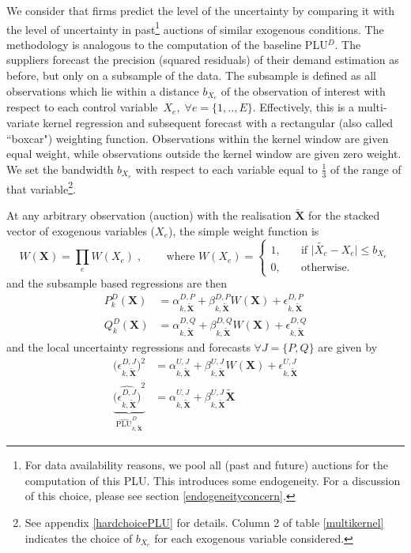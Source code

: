 We consider that firms predict the level of the uncertainty by comparing it with the level of uncertainty in past\footnote{For data availability reasons, we pool all (past and future) auctions for the computation of this PLU. This introduces some endogeneity. For a discussion of this choice, please see section \ref{endogeneityconcern}.} auctions of similar exogenous conditions. 
The methodology is analogous to the computation of the baseline PLU$^D$. The suppliers forecast the precision (squared residuals) of their demand estimation as before, but only on a subsample of the data. The subsample is defined as all observations which lie within a distance $b_{X_e}$ of the observation of interest with respect to each %
control variable~$X_e , \; \forall e=\{1,..,E\}$. Effectively, this is a multi-variate kernel regression and subsequent forecast with a rectangular (also called ``boxcar") weighting function. Observations within the kernel window are given equal weight, while observations outside the kernel window are given zero weight. We set the bandwidth $b_{X_e}$ with respect to each variable equal to $\frac{1}{3}$ of the range of that variable\footnote{See appendix \ref{hardchoicePLU} for details. Column 2 of table \ref{multikernel} indicates the choice of $b_{X_e}$ for each exogenous variable considered.}. 

At any arbitrary observation (auction) with the realisation $\boldsymbol{\tilde{X}}$ for the stacked vector of exogenous variables ($X_e$), the simple weight function is 
\begin{equation}
W(\boldsymbol{X}) =  \prod_{e} W(X_e) \; \text{,} \quad  \quad  \text{ where  } 
W(X_e) = \begin{cases} 1, \quad & \mbox{if } \vert \tilde{X_e} - X_e \vert \leq b_{X_e} 
\\ 
0, \quad & \mbox{otherwise. } \end{cases}
\end{equation}
and the subsample based regressions are then
\begin{align}
P^D_k(\boldsymbol{X}) &= \alpha^{D,P}_{k,\boldsymbol{\tilde{X}}} + \beta^{D,P}_{k,\boldsymbol{\tilde{X}}} W(\boldsymbol{X}) + \epsilon^{D,P}_{k,\boldsymbol{\tilde{X}}} \\
Q^D_k(\boldsymbol{X}) &= \alpha^{D,Q}_{k,\boldsymbol{\tilde{X}}} + \beta^{D,Q}_{k,\boldsymbol{\tilde{X}}} W(\boldsymbol{X}) + \epsilon^{D,Q}_{k,\boldsymbol{\tilde{X}}} 
\end{align}
and the local uncertainty regressions and forecasts $\forall J=\{P,Q\} $ are given  by
\begin{align}
\bigl(\epsilon^{D,J}_{k,\boldsymbol{\tilde{X}}}\bigr)^2 &= \alpha^{U,J}_{k,\boldsymbol{\tilde{X}}} + \beta^{U,J}_{k,\boldsymbol{\tilde{X}}} W(\boldsymbol{X})  + \epsilon^{U,J}_{k,\boldsymbol{\tilde{X}}} \\
%
\underbrace{\widehat{\bigl(\epsilon^{D,J}_{k,\boldsymbol{\tilde{X}}}\bigr)}^2}_{\widehat{\text{PLU}}^D_{k, \boldsymbol{\tilde{X}}}} &= \alpha^{U,J}_{k,\boldsymbol{\tilde{X}}} + \beta^{U,J}_{k,\boldsymbol{\tilde{X}}} \boldsymbol{\tilde{X}}
\end{align}

